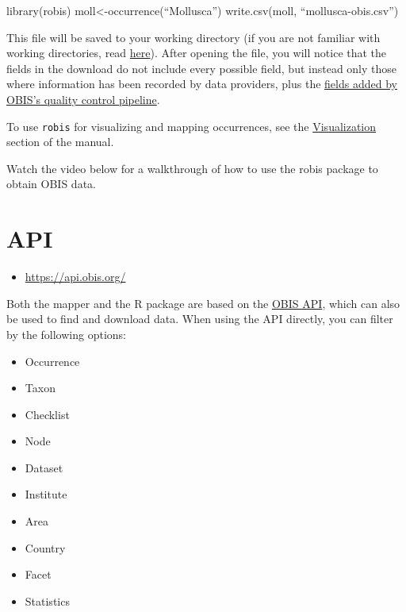 \documentclass[
  letterpaper,
  DIV=11,
  numbers=noendperiod,
  oneside]{scrreprt}
\newenvironment{Shaded}{\begin{snugshade}}{\end{snugshade}}
\newcommand{\FunctionTok}[1]{\textcolor[rgb]{0.28,0.35,0.67}{#1}}
\newcommand{\NormalTok}[1]{\textcolor[rgb]{0.00,0.23,0.31}{#1}}
\newcommand{\OtherTok}[1]{\textcolor[rgb]{0.00,0.23,0.31}{#1}}
\newcommand{\SpecialCharTok}[1]{\textcolor[rgb]{0.37,0.37,0.37}{#1}}
\providecommand{\tightlist}{%
  \setlength{\itemsep}{0pt}\setlength{\parskip}{0pt}}\usepackage{longtable,booktabs,array}
\begin{document}
\begin{Shaded}
\begin{Highlighting}[]
\FunctionTok{library}\NormalTok{(robis)}
\NormalTok{moll}\OtherTok{\textless{}{-}}\FunctionTok{occurrence}\NormalTok{(“Mollusca”)}
\FunctionTok{write.csv}\NormalTok{(moll, “mollusca}\SpecialCharTok{{-}}\NormalTok{obis.csv”)}
\end{Highlighting}
\end{Shaded}

This file will be saved to your working directory (if you are not
familiar with working directories, read
\href{https://bookdown.org/ndphillips/YaRrr/the-working-directory.html}{here}).
After opening the file, you will notice that the fields in the download
do not include every possible field, but instead only those where
information has been recorded by data providers, plus the
\protect\hyperlink{interpreting-downloaded-files-from-obis}{fields added
by OBIS's quality control pipeline}.

To use \texttt{robis} for visualizing and mapping occurrences, see the
\href{dataviz.html}{Visualization} section of the manual.

Watch the video below for a walkthrough of how to use the robis package
to obtain OBIS data.

\hypertarget{api}{%
\section{API}\label{api}}

\begin{itemize}
\tightlist
\item
  \url{https://api.obis.org/}
\end{itemize}

Both the mapper and the R package are based on the
\href{https://api.obis.org/}{OBIS API}, which can also be used to find
and download data. When using the API directly, you can filter by the
following options:

\begin{itemize}
\tightlist
\item
  Occurrence
\item
  Taxon
\item
  Checklist
\item
  Node
\item
  Dataset
\item
  Institute
\item
  Area
\item
  Country
\item
  Facet
\item
  Statistics
\end{itemize}
\end{document}
